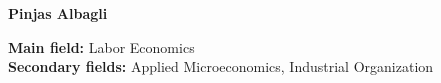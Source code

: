 \documentclass[letterpaper, 12pt]{article}
\begin{document}
	
	
	\thispagestyle{first}
	\begin{center}
		\LARGE
		\textbf{Pinjas Albagli}
	\end{center}
	
	\begin{center}
		\small\textbf{Main field:} Labor Economics\\
		\textbf{Secondary fields:} Applied Microeconomics, Industrial Organization
	\end{center}
	\vspace{1.5ex}

	
	
	
	\vspace{.5ex}
		
	
	
	
	\bigskip
	
	
	
	
	\bigskip
	
	
	
	
	\bigskip
	
	
	
	
	\bigskip
	
	
	
	
	\bigskip
	
	
	
	
	\bigskip
	
	
	
	
	

	\thispagestyle{last}
\end{document}
